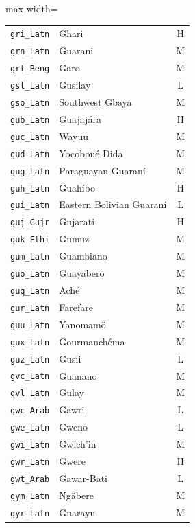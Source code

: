 {\begin{adjustbox}{max width=\textwidth}
\begin{tabular}{llc}
        \texttt{gri\_Latn} & Ghari & H \\
        \texttt{grn\_Latn} & Guarani & M \\
        \texttt{grt\_Beng} & Garo & M \\
        \texttt{gsl\_Latn} & Gusilay & L \\
        \texttt{gso\_Latn} & Southwest Gbaya & M \\
        \texttt{gub\_Latn} & Guajajára & H \\
        \texttt{guc\_Latn} & Wayuu & M \\
        \texttt{gud\_Latn} & Yocoboué Dida & M \\
        \texttt{gug\_Latn} & Paraguayan Guaraní & M \\
        \texttt{guh\_Latn} & Guahibo & H \\
        \texttt{gui\_Latn} & Eastern Bolivian Guaraní & L \\
        \texttt{guj\_Gujr} & Gujarati & H \\
        \texttt{guk\_Ethi} & Gumuz & M \\
        \texttt{gum\_Latn} & Guambiano & M \\
        \texttt{guo\_Latn} & Guayabero & M \\
        \texttt{guq\_Latn} & Aché & M \\
        \texttt{gur\_Latn} & Farefare & M \\
        \texttt{guu\_Latn} & Yanomamö & M \\
        \texttt{gux\_Latn} & Gourmanchéma & M \\
        \texttt{guz\_Latn} & Gusii & L \\
        \texttt{gvc\_Latn} & Guanano & M \\
        \texttt{gvl\_Latn} & Gulay & M \\
        \texttt{gwc\_Arab} & Gawri & L \\
        \texttt{gwe\_Latn} & Gweno & L \\
        \texttt{gwi\_Latn} & Gwich'in & M \\
        \texttt{gwr\_Latn} & Gwere & H \\
        \texttt{gwt\_Arab} & Gawar-Bati & L \\
        \texttt{gym\_Latn} & Ngäbere & M \\
        \texttt{gyr\_Latn} & Guarayu & M \\
        \bottomrule
    \end{tabular}
    \quad
    \begin{tabular}{llc}

\end{tabular}
\end{adjustbox}}
